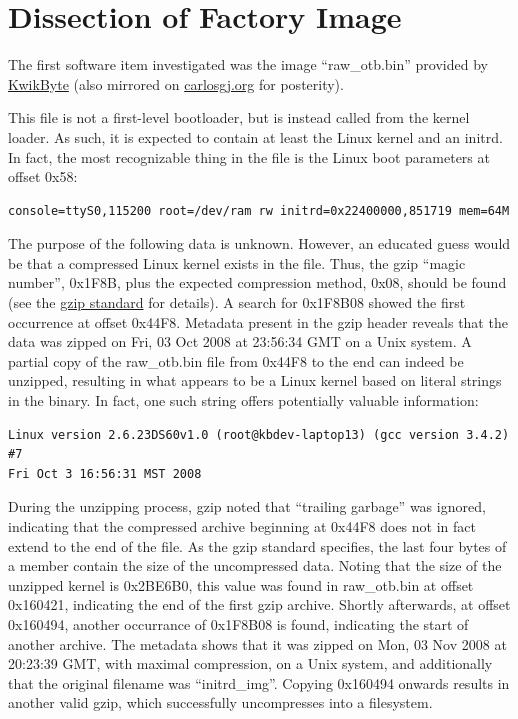 \documentclass[]{article}
\begin{document}
\section{Dissection of Factory Image}
\par The first software item investigated was the image ``raw\_otb.bin'' provided by \href{http://www.kwikbyte.com/driverstation/binary/raw_otb.bin}{KwikByte} (also mirrored on \href{http://carlosgj.org/FRC/DS9260/raw_otb.bin}{carlosgj.org} for posterity).
\par This file is not a first-level bootloader, but is instead called from the kernel loader. As such, it is expected to contain at least the Linux kernel and an initrd. In fact, the most recognizable thing in the file is the Linux boot parameters at offset 0x58:
\begin{verbatim}
console=ttyS0,115200 root=/dev/ram rw initrd=0x22400000,851719 mem=64M
\end{verbatim}
\par The purpose of the following data is unknown. However, an educated guess would be that a compressed Linux kernel exists in the file. Thus, the gzip ``magic number'', 0x1F8B, plus the expected compression method, 0x08, should be found (see the \href{https://tools.ietf.org/html/rfc1952}{gzip standard} for details). A search for 0x1F8B08 showed the first occurrence at offset 0x44F8. Metadata present in the gzip header reveals that the data was zipped on Fri, 03 Oct 2008 at 23:56:34 GMT on a Unix system. A partial copy of the raw\_otb.bin file from 0x44F8 to the end can indeed be unzipped, resulting in what appears to be a Linux kernel based on literal strings in the binary. In fact, one such string offers potentially valuable information:
\begin{verbatim}
Linux version 2.6.23DS60v1.0 (root@kbdev-laptop13) (gcc version 3.4.2) #7 
Fri Oct 3 16:56:31 MST 2008
\end{verbatim}
\par During the unzipping process, gzip noted that ``trailing garbage'' was ignored, indicating that the compressed archive beginning at 0x44F8 does not in fact extend to the end of the file. As the gzip standard specifies, the last four bytes of a member contain the size of the uncompressed data. Noting that the size of the unzipped kernel is 0x2BE6B0, this value was found in raw\_otb.bin at offset 0x160421, indicating the end of the first gzip archive. Shortly afterwards, at offset 0x160494, another occurrance of 0x1F8B08 is found, indicating the start of another archive. The metadata shows that it was zipped on Mon, 03 Nov 2008 at 20:23:39 GMT, with maximal compression, on a Unix system, and additionally that the original filename was ``initrd\_img''. Copying 0x160494 onwards results in another valid gzip, which successfully uncompresses into a filesystem.
\end{document}
